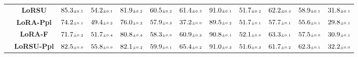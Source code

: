 \begin{table}
\begin{center}
\begin{small}
\begin{tabular}{l c c c c c c c c c c c}
& \textbf{LoRSU} & $85.3 \mtiny{\pm 0.1}$ & $54.2 \mtiny{\pm 0.1}$ & $81.9 \mtiny{\pm 0.2}$ & $60.5 \mtiny{\pm 0.2}$ & $61.4 \mtiny{\pm 0.3}$ & $91.0 \mtiny{\pm 0.1}$ & $51.7 \mtiny{\pm 0.2}$ & $62.2 \mtiny{\pm 0.4}$ & $58.9 \mtiny{\pm 0.1}$ & $31.8 \mtiny{\pm 0.1}$ \\
& \textbf{LoRA-Ppl} & $74.2 \mtiny{\pm 0.1}$ & $49.4 \mtiny{\pm 0.2}$ & $76.0 \mtiny{\pm 0.2}$ & $57.9 \mtiny{\pm 0.3}$ & $37.2 \mtiny{\pm 0.0}$ & $89.5 \mtiny{\pm 0.2}$ & $51.7 \mtiny{\pm 0.1}$ & $57.7 \mtiny{\pm 0.1}$ & $55.6 \mtiny{\pm 0.1}$ & $29.8 \mtiny{\pm 0.1}$ \\
& \textbf{LoRA-F} & $71.7 \mtiny{\pm 0.2}$ & $51.7 \mtiny{\pm 0.4}$ & $80.8 \mtiny{\pm 0.4}$ & $58.3 \mtiny{\pm 0.0}$ & $60.9 \mtiny{\pm 0.3}$ & $90.8 \mtiny{\pm 0.1}$ & $52.1 \mtiny{\pm 0.0}$ & $63.3 \mtiny{\pm 0.1}$ & $57.5 \mtiny{\pm 0.0}$ & $30.9 \mtiny{\pm 0.1}$ \\
& \textbf{LoRSU-Ppl} & $82.5 \mtiny{\pm 0.0}$ & $55.8 \mtiny{\pm 0.0}$ & $82.1 \mtiny{\pm 0.2}$ & $59.9 \mtiny{\pm 0.1}$ & $65.4 \mtiny{\pm 0.2}$ & $91.0 \mtiny{\pm 0.3}$ & $51.6 \mtiny{\pm 0.3}$ & $61.7 \mtiny{\pm 0.2}$ & $62.3 \mtiny{\pm 0.1}$ & $32.2 \mtiny{\pm 0.0}$ \\
\bottomrule
\end{tabular}
\endgroup
\end{small}
\end{center}
\vskip -0.1in
\end{table}


